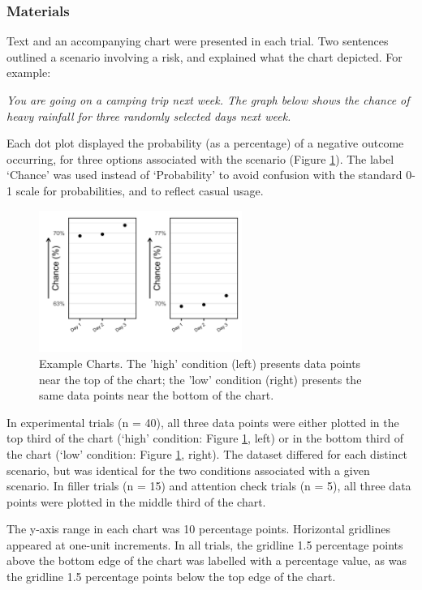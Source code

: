 \documentclass[journal]{vgtc}                %
\begin{document}
\hypertarget{materials}{%
\subsubsection{Materials}\label{materials}}

Text and an accompanying chart were presented in each trial. Two sentences outlined a scenario involving a risk, and explained what the chart depicted. For example:

\emph{You are going on a camping trip next week. The graph below shows the chance of heavy rainfall for three randomly selected days next week.}

Each dot plot displayed the probability (as a percentage) of a negative outcome occurring, for three options associated with the scenario (Figure \ref{fig:example-charts}). The label `Chance' was used instead of `Probability' to avoid confusion with the standard 0-1 scale for probabilities, and to reflect casual usage.

\begin{figure}
\includegraphics[width=250px]{position_magnitude_files/figure-latex/example-charts-1} \caption{Example Charts. The 'high' condition (left) presents data points near the top of the chart; the 'low' condition (right) presents the same data points near the bottom of the chart.}\label{fig:example-charts}
\end{figure}

In experimental trials (n = 40), all three data points were either plotted in the top third of the chart (`high' condition: Figure \ref{fig:example-charts}, left) or in the bottom third of the chart (`low' condition: Figure \ref{fig:example-charts}, right). The dataset differed for each distinct scenario, but was identical for the two conditions associated with a given scenario. In filler trials (n = 15) and attention check trials (n = 5), all three data points were plotted in the middle third of the chart.

The y-axis range in each chart was 10 percentage points. Horizontal gridlines appeared at one-unit increments. In all trials, the gridline 1.5 percentage points above the bottom edge of the chart was labelled with a percentage value, as was the gridline 1.5 percentage points below the top edge of the chart.
\end{document}
